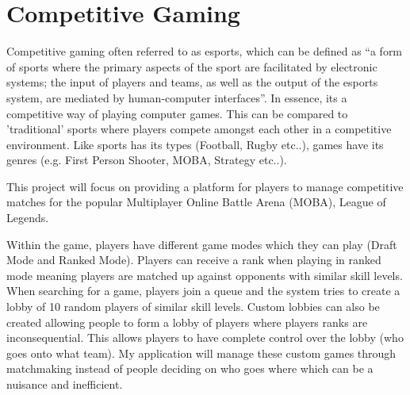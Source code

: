 \section{Competitive Gaming}
Competitive gaming often referred to as esports, which can be defined as \cite{sjoblom2019esports} “a form of sports where the primary aspects of the sport are facilitated by electronic systems; the input of players and teams, as well as the output of the esports system, are mediated by human-computer interfaces”. In essence, its a competitive way of playing computer games. This can be compared to 'traditional' sports where players compete amongst each other in a competitive environment. Like sports has its types (Football, Rugby etc..), games have its genres (e.g. First Person Shooter, MOBA, Strategy etc..).\newline


This project will focus on providing a platform for players to manage competitive matches for the popular Multiplayer Online Battle Arena (MOBA), League of Legends.\newline

Within the game, players have different game modes which they can play
(Draft Mode and Ranked Mode). Players can receive a rank when playing in ranked mode meaning players are matched up against opponents with similar skill levels. When searching for a game, players join a queue and the system tries to create a lobby of 10 random players of similar skill levels. Custom lobbies can also be created allowing people to form a lobby of players where players ranks are inconsequential. This allows players to have complete control over the lobby (who goes onto what team). My application will manage these custom games through matchmaking instead of people deciding on who goes where which can be a nuisance and inefficient.

